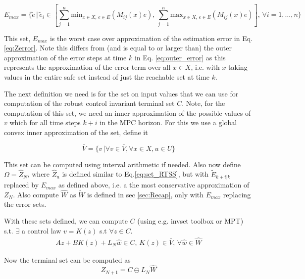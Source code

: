 \documentclass{article}[14pt]
\begin{document}
\begin{equation}
E_{max} = \{\tilde{e}\,|\,\tilde{e}_i\in[\sum_{j=1}^n \text{min}_{x\in X,\,e\in E}(M_{ij}(x)e),\, \sum_{j=1}^n \text{max}_{x\in X,\,e\in E}(M_{ij}(x)e)],\,\forall i=1,\dotsc,n\}
\end{equation}

This set, $E_{max}$ is the worst case over approximation of the estimation error in Eq.\ref{eq:Zerror}. Note this differs from (and is equal to or larger than) the outer approximation of the error steps at time $k$ in Eq. \ref{eq:outer_error} as this represents the approximation of the error term over all $x\in X$, i.e. with $x$ taking values in the entire safe set instead of just the reachable set at time $k$.

The next definition we need is for the set on input values that we can use for computation of the robust control invariant terminal set $C$. Note, for the computation of this set, we need an inner approximation of the possible values of $v$ which for all time steps $k+i$ in the MPC horizon. For this we use a global convex inner approximation of the set, define it

\begin{equation}
\bar{V} = \{v\,|\forall v\in \bar{V},\forall x\in X, u\in U\}
\end{equation}

This set can be computed using interval arithmetic if needed. Also now define $\Omega=\hat{Z}_N$, where $\hat{Z}_n$ is defined similar to Eq.\ref{eq:set_RTSS}, but with $\tilde{E}_{k+i|k}$ replaced by $E_{max}$ as defined above, i.e. a the most conservative approximation of $Z_N$. Also compute $\hat{W}$ as $\tilde{W}$ is defined in sec \ref{sec:Recap}, only with $E_{max}$ replacing the error sets.

With these sets defined, we can compute $C$ (using e.g. invset toolbox or MPT) s.t. $\exists$ a control law $v=K(z)$ s.t $\forall z \in C$.
\begin{subequations}
\begin{align}
Az+BK(z)+L_N\hat{w}\in C,\, K(z)\in \bar{V}, \,\forall \hat{w} \in \hat{W}
\end{align}
\end{subequations}

Now the terminal set can be computed as 
\begin{equation}
Z_{N+1}=C\ominus L_N\hat{W}
\end{equation}
\end{document}
